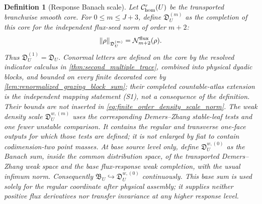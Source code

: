 \documentclass[11pt]{amsart}
\theoremstyle{compactplain}
\theoremstyle{compactdefinition}
\newtheorem{definition}[theorem]{Definition}
\theoremstyle{compactremark}
\begin{document}
\begin{definition}[Response Banach scale]
\label{def:finite_order_response_scale}
Let \(\mathcal C_{\rm hom}^r(U)\) be the transported branchwise smooth core.
For \(0\le m\le J+3\), define \(\mathfrak D_U^{(m)}\) as the completion of this
core for the independent flux-seed norm of order \(m+2\):
\begin{equation}
\label{eq:finite_order_density_scale_norm}
  \|\rho\|_{\mathfrak D_U^{(m)}}
  =
  \mathcal N_{m+2}^{\rm flux}(\rho).
\end{equation}
Thus \(\mathfrak D_U^{(1)}=\mathfrak D_U\).  Conormal letters are defined on
the core by the resolved indicator calculus in
\cref{thm:second_multiple_trace}, combined into physical dyadic blocks, and
bounded on every finite decorated core by
\cref{lem:renormalized_grazing_block_sum}; their completed countable-atlas
extension is the independent mapping statement (S1), not a consequence of the
definition.  Their bounds are not inserted in
\eqref{eq:finite_order_density_scale_norm}.  The weak density scale
\(\mathfrak D_U^{w,(m)}\) uses the corresponding Demers--Zhang stable-leaf
tests and one fewer unstable comparison.  It contains the regular and
transverse one-face outputs for which those tests are defined; it is not
enlarged by fiat to contain codimension-two point masses.
At base source level only, define
\(\mathfrak D_U^{w,(0)}\) as the Banach sum, inside the common distribution
space, of the transported Demers--Zhang weak space and the base flux-response
weak completion, with the usual infimum norm.  Consequently
\(\mathfrak B_U\hookrightarrow\mathfrak D_U^{w,(0)}\) continuously.  This
base sum is used solely for the regular coordinate after physical assembly;
it supplies neither positive flux derivatives nor transfer invariance at any
higher response level.


\end{definition}
\end{document}
